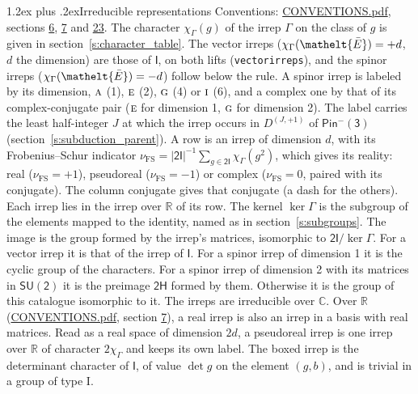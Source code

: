 \documentclass[10pt,a4paper]{article}
\makeatletter
\renewcommand\section{\@startsection{section}{1}{\z@}{-3ex plus -1ex minus -.2ex}%
  {1.2ex plus .2ex}{\normalfont\large\sffamily\bfseries\color{parttitle}}}
\numberwithin{equation}{section}
\newcommand{\eltfont}[1]{{\let\sigma\eltsigma\mathelt{#1}}}
\newcommand{\grp}[1]{\mathsf{#1}}
\newcommand{\irr}[1]{\text{\normalfont\scshape #1}}
\newcommand{\elt}[1]{\eltfont{#1}}
\newcommand{\irrJp}[2]{D^{(#1,#2)}}
\newcommand{\irchar}[1]{\chi_{#1}}
\newcommand{\fsind}{\nu_{\mathrm{FS}}}
\newcommand{\barred}[1]{\bar{#1}}
\makeatother
\begin{document}
\section{Irreducible representations}\label{s:irreps}
Conventions: \href{../../CONVENTIONS.pdf}{CONVENTIONS.pdf}, sections \href{../../../rotation/CONVENTIONS.pdf\#conv.6}{6}, \href{../../../rotation/CONVENTIONS.pdf\#conv.7}{7} and \href{../../CONVENTIONS.pdf\#conv.23}{23}.
\leavevmode\label{n:function.character}\label{n:irrep.Gamma}The character $\irchar{\Gamma}(g)$ of the irrep $\Gamma$ on the class of $g$ is given in section~\ref{s:character_table}. \label{n:index.dimension}The vector irreps ($\irchar{\Gamma}(\elt{\barred{E}}) = +d$, $d$ the dimension) are those of \href{../../../rotation/data/pdf/I.pdf}{$\grp{I}$}, on both lifts (\texttt{vectorirreps}), and the spinor irreps ($\irchar{\Gamma}(\elt{\barred{E}}) = -d$) follow below the rule. A spinor irrep is labeled by its dimension, $\irr{a}$ (1), $\irr{e}$ (2), $\irr{g}$ (4) or $\irr{i}$ (6), and a complex one by that of its complex-conjugate pair ($\irr{e}$ for dimension 1, $\irr{g}$ for dimension 2). The label carries the least half-integer $J$ at which the irrep occurs in $\irrJp{J}{+1}$ of $\grp{Pin^{-}(3)}$ (section~\ref{s:subduction_parent}).
\leavevmode\label{n:index.frobenius}\label{n:head.irrep}\label{n:head.reality}A row is an irrep of dimension $d$, with its Frobenius--Schur indicator $\fsind = |\grp{2I}|^{-1}\allowbreak\sum_{g\in\grp{2I}}\irchar{\Gamma}(g^2)$, which gives its reality: real ($\fsind = +1$), pseudoreal ($\fsind = -1$) or complex ($\fsind = 0$, paired with its conjugate). \label{n:head.conjugate}The column conjugate gives that conjugate (a dash for the others). \label{n:head.over.real}Each irrep lies in the irrep over $\mathbb{R}$ of its row. \label{n:head.kernel}The kernel $\ker\Gamma$ is the subgroup of the elements mapped to the identity, named as in section~\ref{s:subgroups}. \label{n:head.image}The image is the group formed by the irrep's matrices, isomorphic to $\grp{2I}/\ker\Gamma$. For a vector irrep it is that of the irrep of \href{../../../rotation/data/pdf/I.pdf}{$\grp{I}$}. For a spinor irrep of dimension 1 it is the cyclic group of the characters. For a spinor irrep of dimension 2 with its matrices in $\grp{SU(2)}$ it is the preimage $\grp{2H}$ formed by them. Otherwise it is the group of this catalogue isomorphic to it. The irreps are irreducible over $\mathbb{C}$. Over $\mathbb{R}$ (\href{../../CONVENTIONS.pdf}{CONVENTIONS.pdf}, section \href{../../../rotation/CONVENTIONS.pdf\#conv.7}{7}), a real irrep is also an irrep in a basis with real matrices. Read as a real space of dimension $2d$, a pseudoreal irrep is one irrep over $\mathbb{R}$ of character $2\irchar{\Gamma}$ and keeps its own label. \label{n:mark.determinant}The boxed irrep is the determinant character of \href{../../../rotation/data/pdf/I.pdf}{$\grp{I}$}, of value $\det g$ on the element $(g, b)$, and is trivial in a group of type I.
\end{document}
